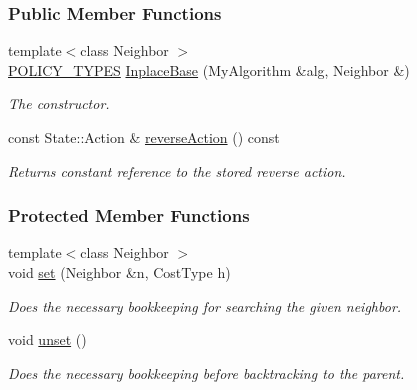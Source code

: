 \subsubsection*{Public Member Functions}
\begin{DoxyCompactItemize}
\item 
{\footnotesize template$<$class Neighbor $>$ }\\\hyperlink{extensions_2shared__policies_2headers_8h_ae70a06fa4631780beea14971eb36a562}{P\+O\+L\+I\+C\+Y\+\_\+\+T\+Y\+P\+ES} \hyperlink{structslb_1_1ext_1_1policy_1_1backtrackLock_1_1InplaceBase_a7094400b487ebbfbb4f1fe7c1f3df142}{Inplace\+Base} (My\+Algorithm \&alg, Neighbor \&)
\begin{DoxyCompactList}\small\item\em The constructor. \end{DoxyCompactList}\item 
const State\+::\+Action \& \hyperlink{structslb_1_1ext_1_1policy_1_1backtrackLock_1_1InplaceBase_a3303fe718a64b292c2a9f5e3be312ddc}{reverse\+Action} () const 
\begin{DoxyCompactList}\small\item\em Returns constant reference to the stored reverse action. \end{DoxyCompactList}\end{DoxyCompactItemize}
\subsubsection*{Protected Member Functions}
\begin{DoxyCompactItemize}
\item 
{\footnotesize template$<$class Neighbor $>$ }\\void \hyperlink{structslb_1_1ext_1_1policy_1_1backtrackLock_1_1InplaceBase_a805ae83a7f9d9fb79de6894db7c85bea}{set} (Neighbor \&n, Cost\+Type h)
\begin{DoxyCompactList}\small\item\em Does the necessary bookkeeping for searching the given neighbor. \end{DoxyCompactList}\item 
void \hyperlink{structslb_1_1ext_1_1policy_1_1backtrackLock_1_1InplaceBase_a5ac11057420d465ee33087c504c026e0}{unset} ()\hypertarget{structslb_1_1ext_1_1policy_1_1backtrackLock_1_1InplaceBase_a5ac11057420d465ee33087c504c026e0}{}\label{structslb_1_1ext_1_1policy_1_1backtrackLock_1_1InplaceBase_a5ac11057420d465ee33087c504c026e0}

\begin{DoxyCompactList}\small\item\em Does the necessary bookkeeping before backtracking to the parent. \end{DoxyCompactList}\end{DoxyCompactItemize}
